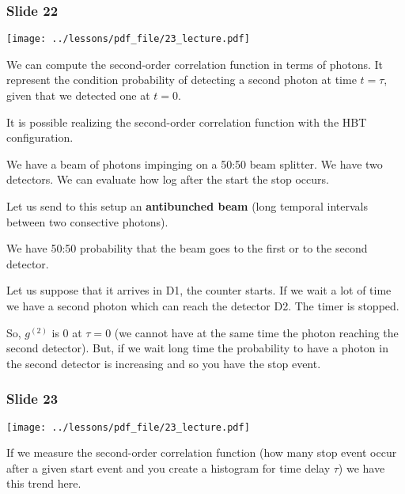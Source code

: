 \documentclass[../main/main.tex]{subfiles}
\begin{document}
\subsubsection*{Slide 22}

\begin{minipage}[]{0.5\linewidth}
\centering
\texttt{[image: ../lessons/pdf\_file/23\_lecture.pdf]}
\end{minipage}
\hspace{0.3cm}\vspace{0.3cm}
\begin{minipage}[c]{0.47\linewidth}

We can compute the second-order correlation function in terms of photons. It represent the condition probability of detecting a second photon at time \( t = \tau  \), given that we detected one at \( t=0 \).

It is possible realizing the second-order correlation function with the HBT configuration.

We have a beam of photons impinging on a 50:50 beam splitter. We have two detectors. We can evaluate how log after the start the stop occurs.

Let us send to this setup an \textbf{antibunched beam} (long temporal intervals between two consective photons).

We have 50:50 probability that the beam goes to the first or to the second detector.

Let us suppose that it arrives in D1, the counter starts. If we wait a lot of time we have a second photon which can reach the detector D2. The timer is stopped.

\end{minipage}

So, \( g^{(2)} \) is 0 at \( \tau = 0 \) (we cannot have at the same time the photon reaching the second detector).
But, if we wait long time the probability to have a photon in the second detector is increasing and so you have the stop event.

\subsubsection*{Slide 23}

\begin{minipage}[]{0.5\linewidth}
\centering
\texttt{[image: ../lessons/pdf\_file/23\_lecture.pdf]}
\end{minipage}
\hspace{0.3cm}\vspace{0.3cm}
\begin{minipage}[c]{0.47\linewidth}

If we measure the second-order correlation function (how many stop event occur after a given start event and you create a histogram for time delay \( \tau  \)) we have this trend here.

\end{minipage}
\end{document}
